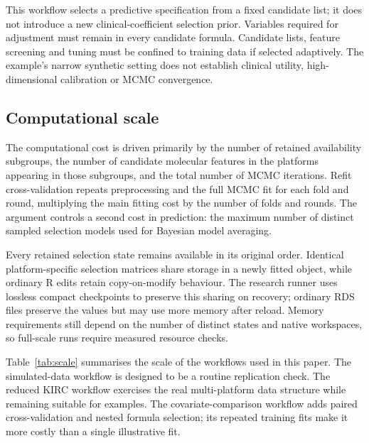 \documentclass[article]{jss}
\begin{document}
This workflow selects a predictive specification from a fixed candidate list;
it does not introduce a new clinical-coefficient selection prior. Variables
required for adjustment must remain in every candidate formula. Candidate lists,
feature screening and tuning must be confined to training data if selected
adaptively. The example's narrow synthetic setting does not establish clinical
utility, high-dimensional calibration or MCMC convergence.

\subsection{Computational scale}\label{sec:computational-scale}

The computational cost is driven primarily by the number of retained
availability subgroups, the number of candidate molecular features in the
platforms appearing in those subgroups, and the total number of MCMC iterations.
Refit cross-validation repeats preprocessing and the full MCMC fit for each fold
and round, multiplying the main fitting cost by the number of folds and rounds.
The argument  controls a second
cost in prediction: the maximum number of distinct sampled selection
models used for Bayesian model averaging.

Every retained selection state remains available in its original order.
Identical platform-specific selection matrices share storage in a newly fitted
object, while ordinary R edits retain copy-on-modify behaviour. The research
runner uses lossless compact checkpoints to preserve this sharing on recovery;
ordinary RDS files preserve the values but may use more memory after reload.
Memory requirements still depend on the number of distinct states and native
workspaces, so full-scale runs require measured resource checks.

Table~\ref{tab:scale} summarises the scale of the workflows used in this
paper.  The simulated-data workflow is designed to be a routine replication
check.  The reduced KIRC workflow exercises the real multi-platform data
structure while remaining suitable for examples. The covariate-comparison
workflow adds paired cross-validation and nested formula selection; its repeated
training fits make it more costly than a single illustrative fit.
\end{document}
